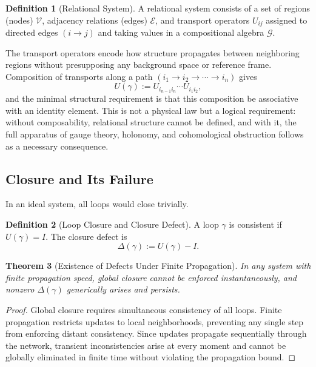 \documentclass[12pt,a4paper,openany]{book}
\theoremstyle{plain}
\newtheorem{theorem}{Theorem}[chapter]
\theoremstyle{definition}
\newtheorem{definition}[theorem]{Definition}
\theoremstyle{remark}
\begin{document}
\begin{definition}[Relational System]
A relational system consists of a set of regions (nodes) $\mathcal{V}$, adjacency relations (edges) $\mathcal{E}$, and transport operators $U_{ij}$ assigned to directed edges $(i \to j)$ and taking values in a compositional algebra $\mathcal{G}$.
\end{definition}

The transport operators encode how structure propagates between neighboring regions without presupposing any background space or reference frame. Composition of transports along a path $(i_1 \to i_2 \to \cdots \to i_n)$ gives
\[
U(\gamma) := U_{i_{n-1}i_n}\cdots U_{i_1 i_2},
\]
and the minimal structural requirement is that this composition be associative with an identity element. This is not a physical law but a logical requirement: without composability, relational structure cannot be defined, and with it, the full apparatus of gauge theory, holonomy, and cohomological obstruction follows as a necessary consequence.

\subsection{Closure and Its Failure}

In an ideal system, all loops would close trivially.

\begin{definition}[Loop Closure and Closure Defect]
A loop $\gamma$ is consistent if $U(\gamma) = I$. The closure defect is
\[
\Delta(\gamma) := U(\gamma) - I.
\]
\end{definition}

\begin{theorem}[Existence of Defects Under Finite Propagation]
In any system with finite propagation speed, global closure cannot be enforced instantaneously, and nonzero $\Delta(\gamma)$ generically arises and persists.
\end{theorem}

\begin{proof}
Global closure requires simultaneous consistency of all loops. Finite propagation restricts updates to local neighborhoods, preventing any single step from enforcing distant consistency. Since updates propagate sequentially through the network, transient inconsistencies arise at every moment and cannot be globally eliminated in finite time without violating the propagation bound.
\end{proof}
\end{document}

